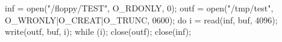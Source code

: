 \documentclass[varwidth=22.5em,crop]{standalone}
\begin{document}
\begin{ccode}
inf = open("/floppy/TEST", O_RDONLY, 0);
outf = open("/tmp/test",
            O_WRONLY|O_CREAT|O_TRUNC, 0600);
do {
    i = read(inf, buf, 4096);
    write(outf, buf, i);
} while (i);
close(outf);
close(inf);
\end{ccode}
\end{document}
